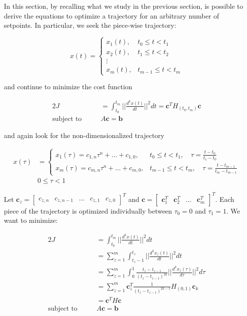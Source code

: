 In this section, by recalling what we study in the previous section, is possible to derive the equations to optimize a trajectory for an arbitrary number of setpoints. In particular, we seek the piece-wise trajectory:

\begin{equation}
	x(t)=
	\begin{cases}
		x_1(t), & t_0\le t<t_1 \\
		x_2(t), & t_1\le t<t_2 \\
		\vdots \\
		x_m(t), & t_{m-1}\le t<t_m 	
	\end{cases}
\end{equation}

\noindent and continue to minimize the cost function

\begin{alignat}{2}
	J &= \int_{t_0}^{t_m}\Bigg|\Bigg|\frac{d^kx(t)}{dt}\Bigg|\Bigg|^2dt = \mathbf{c}^TH_{(t_0,t_m)}\mathbf{c} \\
	\text{subject to}\qquad & A\mathbf{c} = \mathbf{b} \nonumber
\end{alignat}

\noindent and again look for the non-dimensionalized trajectory

\begin{align}
	x(\tau) &=
	\begin{cases}
		x_1(\tau) = c_{1,n}\tau^n+\dots+c_{1,0}, & t_0\le t<t_1,\quad \tau=\frac{t-t_0}{t_1-t_0} \\
		x_m(\tau) = c_{m,n}\tau^n+\dots+c_{m,0}, & t_{m-1}\le t<t_m,\quad \tau=\frac{t-t_{m-1}}{t_m-t_{m-1}}
	\end{cases} \\
	& 0\le\tau<1 \nonumber
\end{align}

\noindent Let $\mathbf{c}_z=\begin{bmatrix}c_{z,n} & c_{z,n-1} & \dots & c_{z,1} & c_{z,0}\end{bmatrix}^T$ and $\mathbf{c}=\begin{bmatrix}\mathbf{c}_1^T & \mathbf{c}_2^T & \dots & \mathbf{c}_m^T\end{bmatrix}^T$. Each piece of the trajectory is optimized individually between $\tau_0=0$ and $\tau_1=1$. We want to minimize:

\begin{alignat}{2}
	J &= \int_{t_0}^{t_m}\Bigg|\Bigg|\frac{d^kx(t)}{dt}\Bigg|\Bigg|^2dt \\
	&= \sum\limits_{z=1}^m\int_{t_z-1}^{t_z}\Bigg|\Bigg|\frac{d^kx_z(t)}{dt}\Bigg|\Bigg|^2dt \nonumber \\
	&= \sum\limits_{z=1}^m\int_0^1\frac{t_z-t_{z-1}}{(t_z-t_{z-1})^{2k}}\Bigg|\Bigg|\frac{d^kx_z(\tau)}{d\tau}\Bigg|\Bigg|^2d\tau \nonumber \\
	&= \sum\limits_{z=1}^m \mathbf{c}_z^T\frac{1}{(t_z-t_{z-1})^{2k-1}}H_{(0,1)}\mathbf{c}_k \nonumber \\
	&= \mathbf{c}^TH\mathbf{c} \nonumber \\
	\text{subject to} \qquad & A\mathbf{c}=\mathbf{b} \nonumber
\end{alignat}


